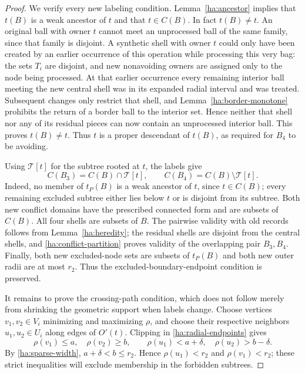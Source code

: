 \documentclass[11pt]{amsart}
\theoremstyle{definition}
\theoremstyle{remark}
\numberwithin{equation}{section}
\begin{document}
\begin{proof}
We verify every new labeling condition.  Lemma~\ref{ha:ancestor}
implies that $t(B)$ is a weak ancestor of $t$ and that $t\in C(B)$.
In fact $t(B)\ne t$.  An original ball with owner $t$ cannot meet an
unprocessed ball of the same family, since that family is disjoint.
A synthetic shell with owner $t$ could only have been created by an
earlier occurrence of this operation while processing this very bag:
the sets $T_i$ are disjoint, and new nonavoiding owners are assigned
only to the node being processed.  At that earlier occurrence every
remaining interior ball meeting the new central shell was in its
expanded radial interval and was treated.  Subsequent changes only
restrict that shell, and Lemma~\ref{ha:border-monotone} prohibits the
return of a border ball to the interior set.  Hence neither that shell
nor any of its residual pieces can now contain an unprocessed
interior ball.  This proves $t(B)\ne t$.  Thus $t$ is a proper
descendant of $t(B)$, as required for $B_4$ to be avoiding.

Using $\mathcal T[t]$ for the subtree rooted at $t$, the labels give
\begin{equation}
 C(B_3)=C(B)\cap\mathcal T[t],
 \qquad C(B_4)=C(B)\setminus\mathcal T[t].
 \label{ha:conflict-partition}
\end{equation}
Indeed, no member of $t_P(B)$ is a weak ancestor of $t$, since
$t\in C(B)$; every remaining excluded subtree either lies below $t$
or is disjoint from its subtree.  Both new conflict domains have the
prescribed connected form and are subsets of $C(B)$.  All four shells
are subsets of $B$.  The pairwise validity with old records follows
from Lemma~\ref{ha:heredity}; the residual shells are disjoint from
the central shells, and \eqref{ha:conflict-partition} proves validity
of the overlapping pair $B_3,B_4$.  Finally, both new excluded-node
sets are subsets of $t_P(B)$ and both new outer radii are at most
$r_2$.  Thus the excluded-boundary-endpoint condition is preserved.

It remains to prove the crossing-path condition, which does not follow
merely from shrinking the geometric support when labels change.
Choose vertices $v_1,v_2\in V_i$ minimizing and maximizing $\rho$, and
choose their respective neighbors $u_1,u_2\in U_i$ along edges of
$O'(t)$.  Clipping in \eqref{ha:radial-endpoints} gives
\begin{equation}
 \rho(v_1)\leq a,\quad \rho(v_2)\geq b,
 \qquad \rho(u_1)<a+\delta,\quad \rho(u_2)>b-\delta.
 \label{ha:radial-witnesses}
\end{equation}
By \eqref{ha:sparse-width}, $a+\delta<b\leq r_2$.  Hence
$\rho(u_1)<r_2$ and $\rho(v_1)<r_2$; these strict inequalities will
exclude membership in the forbidden subtrees.


\end{proof}
\end{document}
